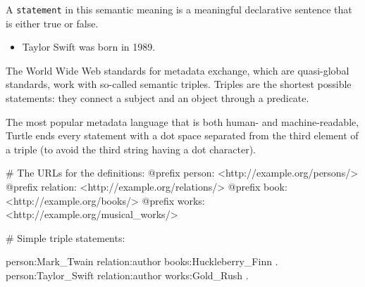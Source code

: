 \documentclass[
  letterpaper,
  DIV=11,
  numbers=noendperiod]{scrreprt}
\newenvironment{Shaded}{\begin{snugshade}}{\end{snugshade}}
\newcommand{\CommentTok}[1]{\textcolor[rgb]{0.37,0.37,0.37}{#1}}
\newcommand{\ErrorTok}[1]{\textcolor[rgb]{0.68,0.00,0.00}{#1}}
\newcommand{\NormalTok}[1]{\textcolor[rgb]{0.00,0.23,0.31}{#1}}
\newcommand{\SpecialCharTok}[1]{\textcolor[rgb]{0.37,0.37,0.37}{#1}}
\providecommand{\tightlist}{%
  \setlength{\itemsep}{0pt}\setlength{\parskip}{0pt}}\usepackage{longtable,booktabs,array}
\begin{document}
A \texttt{statement} in this semantic meaning is a meaningful
declarative sentence that is either true or false.

\begin{itemize}
\tightlist
\item
  Taylor Swift was born in 1989.
\end{itemize}

The World Wide Web standards for metadata exchange, which are
quasi-global standards, work with so-called semantic triples. Triples
are the shortest possible statements: they connect a subject and an
object through a predicate.

The most popular metadata language that is both human- and
machine-readable, Turtle ends every statement with a dot space separated
from the third element of a triple (to avoid the third string having a
dot character).

\begin{Shaded}
\begin{Highlighting}[]
\CommentTok{\# The URLs for the definitions:}
\SpecialCharTok{@}\NormalTok{prefix person}\SpecialCharTok{:} \ErrorTok{\textless{}}\NormalTok{http}\SpecialCharTok{:}\ErrorTok{//}\NormalTok{example.org}\SpecialCharTok{/}\NormalTok{persons}\SpecialCharTok{/}\ErrorTok{\textgreater{}}
\ErrorTok{@}\NormalTok{prefix relation}\SpecialCharTok{:} \ErrorTok{\textless{}}\NormalTok{http}\SpecialCharTok{:}\ErrorTok{//}\NormalTok{example.org}\SpecialCharTok{/}\NormalTok{relations}\SpecialCharTok{/}\ErrorTok{\textgreater{}}
\ErrorTok{@}\NormalTok{prefix book}\SpecialCharTok{:} \ErrorTok{\textless{}}\NormalTok{http}\SpecialCharTok{:}\ErrorTok{//}\NormalTok{example.org}\SpecialCharTok{/}\NormalTok{books}\SpecialCharTok{/}\ErrorTok{\textgreater{}}
\ErrorTok{@}\NormalTok{prefix works}\SpecialCharTok{:} \ErrorTok{\textless{}}\NormalTok{http}\SpecialCharTok{:}\ErrorTok{//}\NormalTok{example.org}\SpecialCharTok{/}\NormalTok{musical\_works}\SpecialCharTok{/}\ErrorTok{\textgreater{}}
  
\CommentTok{\# Simple triple statements:}
  
\NormalTok{person}\SpecialCharTok{:}\NormalTok{Mark\_Twain   relation}\SpecialCharTok{:}\NormalTok{author books}\SpecialCharTok{:}\NormalTok{Huckleberry\_Finn .}
\NormalTok{person}\SpecialCharTok{:}\NormalTok{Taylor\_Swift relation}\SpecialCharTok{:}\NormalTok{author works}\SpecialCharTok{:}\NormalTok{Gold\_Rush .}
\end{Highlighting}
\end{Shaded}
\end{document}
